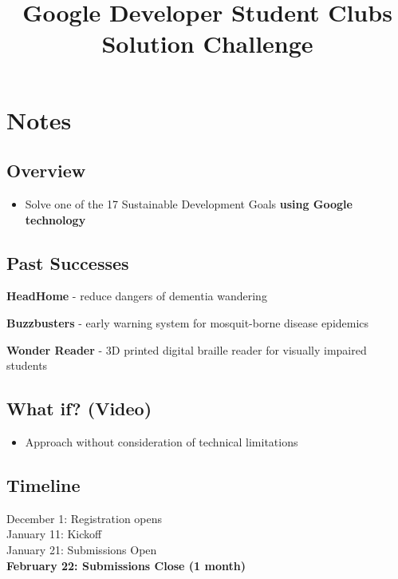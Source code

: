 \documentclass[
]{article}
\title{Google Developer Student Clubs Solution Challenge}
\author{}
\date{}
\providecommand{\tightlist}{%
  \setlength{\itemsep}{0pt}\setlength{\parskip}{0pt}}
\begin{document}
\maketitle

\section{Notes}\label{notes}

\subsection{Overview}\label{overview}

\begin{itemize}
\tightlist
\item
  Solve one of the 17 Sustainable Development Goals \textbf{using Google
  technology}
\end{itemize}

\subsection{Past Successes}\label{past-successes}

\textbf{HeadHome} - reduce dangers of dementia wandering

\textbf{Buzzbusters} - early warning system for mosquit-borne disease
epidemics

\textbf{Wonder Reader} - 3D printed digital braille reader for visually
impaired students

\subsection{What if? (Video)}\label{what-if-video}

\begin{itemize}
\tightlist
\item
  Approach without consideration of technical limitations
\end{itemize}

\subsection{Timeline}\label{timeline}

December 1: Registration opens\\
January 11: Kickoff\\
January 21: Submissions Open\\
\textbf{February 22: Submissions Close (1 month)}
\end{document}
